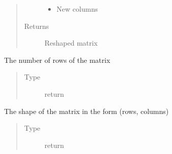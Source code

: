 \documentclass[letterpaper,10pt,english]{sphinxmanual}
\begin{document}
\begin{fulllineitems}
\begin{fulllineitems}
\begin{quote}
\begin{description}
\begin{itemize}
\item {} 
 \textendash{} New columns

\end{itemize}

\item[{Returns}] \leavevmode
Reshaped matrix

\end{description}\end{quote}

\end{fulllineitems}


\begin{fulllineitems}
\label{\detokenize{libpymath.matrix:libpymath.matrix.matrix.Matrix.rows}}
The number of rows of the matrix
\begin{quote}\begin{description}
\item[{Type}] \leavevmode
return

\end{description}\end{quote}

\end{fulllineitems}


\begin{fulllineitems}
\label{\detokenize{libpymath.matrix:libpymath.matrix.matrix.Matrix.shape}}
The shape of the matrix in the form (rows, columns)
\begin{quote}\begin{description}
\item[{Type}] \leavevmode
return

\end{description}\end{quote}

\end{fulllineitems}



\end{fulllineitems}
\end{document}
